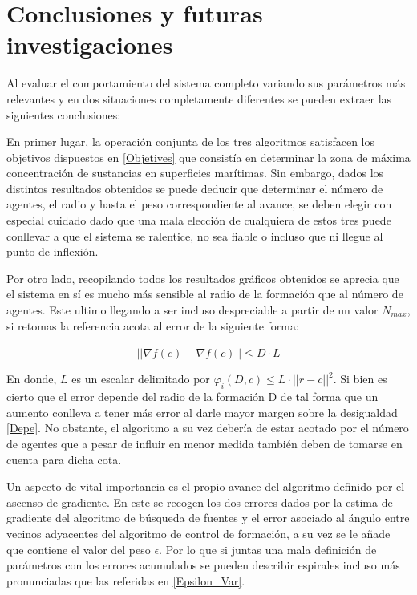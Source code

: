 \newpage
\thispagestyle{empty}
\mbox{}

\chapter{Conclusiones y futuras investigaciones}
\label{ch:chapter4}

Al evaluar el comportamiento del sistema completo variando sus parámetros más relevantes y en dos situaciones completamente diferentes se pueden extraer las siguientes conclusiones:

En primer lugar, la operación conjunta de los tres algoritmos satisfacen los objetivos dispuestos en \ref{Objetives} que consistía en determinar la zona de máxima concentración de sustancias en superficies marítimas. Sin embargo, dados los distintos resultados obtenidos se puede deducir que determinar el número de agentes, el radio y hasta el peso correspondiente al avance, se deben elegir con especial cuidado dado que una mala elección de cualquiera de estos tres puede conllevar a que el sistema se ralentice, no sea fiable o incluso que ni llegue al punto de inflexión.

Por otro lado, recopilando todos los resultados gráficos obtenidos se aprecia que el sistema en sí es mucho más sensible al radio de la formación que al número de agentes. Este ultimo llegando a ser incluso despreciable a partir de un valor $N_{max}$, si retomas la referencia \cite{Adicional_Estimacion_1} acota al error de la siguiente forma:

\begin{equation}\label{Depe}
	||\hat{\nabla}f\left(c\right)-\nabla{f}\left(c\right)||\leqslant{D·L}
\end{equation}

En donde, $L$ es un escalar delimitado por $\varphi_i\left(D,c\right)\leq{L\cdot{||r-c||^2}}$. Si bien es cierto que el error depende del radio de la formación D de tal forma que un aumento conlleva a tener más error al darle mayor margen sobre la desigualdad \ref{Depe}. No obstante, el algoritmo a su vez debería de estar acotado por el número de agentes que a pesar de influir en menor medida también deben de tomarse en cuenta para dicha cota.

Un aspecto de vital importancia es el propio avance del algoritmo definido por el ascenso de gradiente. En este se recogen los dos errores dados por la estima de gradiente del algoritmo de búsqueda de fuentes y el error asociado al ángulo entre vecinos adyacentes del algoritmo de control de formación, a su vez se le añade que contiene el valor del peso $\epsilon$. Por lo que si juntas una mala definición de parámetros con los errores acumulados se pueden describir espirales incluso más pronunciadas que las referidas en \ref{Epsilon_Var}.

